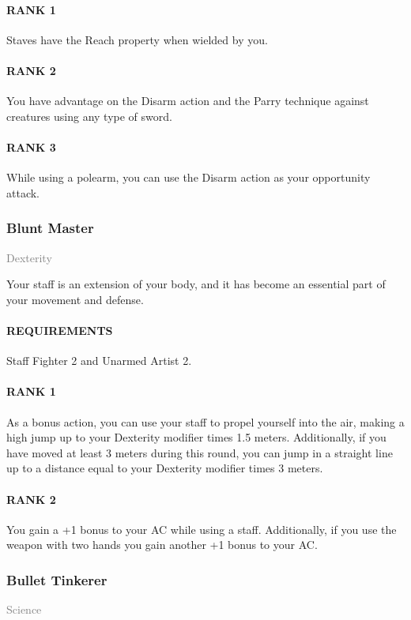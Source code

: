 \paragraph{RANK 1} Staves have the Reach property when wielded by you.
\paragraph{RANK 2} You have advantage on the Disarm action and the Parry technique against creatures using any type of sword.
\paragraph{RANK 3} While using a polearm, you can use the Disarm action as your opportunity attack.

\subsubsection{Blunt Master} \label{feat::bluntmaster}
\small{\textcolor{gray}{Dexterity}}

\normalsize
Your staff is an extension of your body, and it has become an essential part of your movement and defense.
\paragraph{REQUIREMENTS} Staff Fighter 2 and Unarmed Artist 2.
\paragraph{RANK 1} As a bonus action, you can use your staff to propel yourself into the air, making a high jump up to your Dexterity modifier times 1.5 meters.
Additionally, if you have moved at least 3 meters during this round, you can jump in a straight line up to a distance equal to your Dexterity modifier times 3 meters.
\paragraph{RANK 2} You gain a +1 bonus to your AC while using a staff.
Additionally, if you use the weapon with two hands you gain another +1 bonus to your AC.

\subsubsection{Bullet Tinkerer} \label{feat::bullettinkerer}
\small{\textcolor{gray}{Science}}


